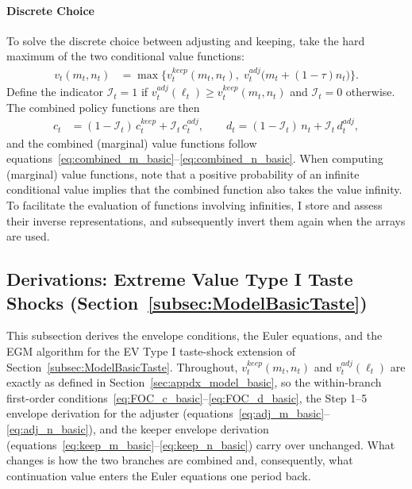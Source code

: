 \paragraph{Discrete Choice}
To solve the discrete choice between adjusting and keeping, take the hard maximum of the two conditional value functions:
\begin{align}
	v_t(m_t,n_t) &= \max\Big\{ v_t^{keep}(m_t,n_t),\; v_t^{adj}\big(m_t + (1-\tau)n_t\big) \Big\}.
\end{align}
Define the indicator $\mathcal{I}_t = 1$ if $v_t^{adj}(\ell_t) \ge v_t^{keep}(m_t,n_t)$ and $\mathcal{I}_t = 0$ otherwise. The combined policy functions are then
\begin{align}
	c_t &= (1-\mathcal{I}_t)\, c_t^{keep} + \mathcal{I}_t\, c_t^{adj}, \qquad
	d_t = (1-\mathcal{I}_t)\, n_t + \mathcal{I}_t\, d_t^{adj},
\end{align}
and the combined (marginal) value functions follow equations~\eqref{eq:combined_m_basic}--\eqref{eq:combined_n_basic}. When computing (marginal) value functions, note that a positive probability of an infinite conditional value implies that the combined function also takes the value infinity. To facilitate the evaluation of functions involving infinities, I store and assess their inverse representations, and subsequently invert them again when the arrays are used.


\subsection{Derivations: Extreme Value Type I Taste Shocks (Section~\ref{subsec:ModelBasicTaste})}\label{subsec:appdx_taste_basic}

This subsection derives the envelope conditions, the Euler equations, and the EGM algorithm for the EV Type I taste-shock extension of Section~\ref{subsec:ModelBasicTaste}. Throughout, $v_t^{keep}(m_t,n_t)$ and $v_t^{adj}(\ell_t)$ are exactly as defined in Section~\ref{sec:appdx_model_basic}, so the within-branch first-order conditions~\eqref{eq:FOC_c_basic}--\eqref{eq:FOC_d_basic}, the Step 1--5 envelope derivation for the adjuster (equations~\eqref{eq:adj_m_basic}--\eqref{eq:adj_n_basic}), and the keeper envelope derivation (equations~\eqref{eq:keep_m_basic}--\eqref{eq:keep_n_basic}) carry over unchanged. What changes is how the two branches are combined and, consequently, what continuation value enters the Euler equations one period back.


